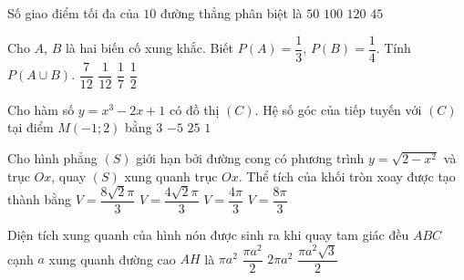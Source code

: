\begin{ex}%
	Số giao điểm tối đa của $10$ đường thẳng phân biệt là
	\choice
	{$50$}
	{$100$}
	{$120$}
	{\True $45$}
\end{ex}

\begin{ex}%
	Cho $A$, $B$ là hai biến cố xung khắc. Biết $P(A)=\dfrac{1}{3}$, $P(B)=\dfrac{1}{4}$. Tính $P(A \cup B)$.
	\choice
	{\True $\dfrac{7}{12}$}
	{$\dfrac{1}{12}$}
	{$\dfrac{1}{7}$}
	{$\dfrac{1}{2}$}
\end{ex}

\begin{ex}%
	Cho hàm số $y=x^3-2x+1$ có đồ thị $(C)$. Hệ số góc của tiếp tuyến với $(C)$ tại điểm $M(-1;2)$ bằng
	\choice
	{$3$}
	{$-5$}
	{$25$}
	{\True $1$}
\end{ex}

\begin{ex}%
	Cho hình phẳng $(S)$ giới hạn bởi đường cong có phương trình $y=\sqrt{2-x^2}$ và trục $Ox$, quay $(S)$ xung quanh trục $Ox$. Thể tích của khối tròn xoay được tạo thành bằng
	\choice
	{\True $V= \dfrac{8\sqrt{2}\pi}{3}$}
	{$V= \dfrac{4\sqrt{2}\pi}{3}$}
	{$V= \dfrac{4\pi}{3}$}
	{$V= \dfrac{8\pi}{3}$}
\end{ex}

\begin{ex}%
	Diện tích xung quanh của hình nón được sinh ra khi quay tam giác đều $ABC$ cạnh $a$ xung quanh đường cao $AH$ là
	\choice
	{$\pi a^2$}
	{\True $\dfrac{\pi a^2}{2}$}
	{$2 \pi a^2$}
	{$\dfrac{\pi a^2 \sqrt{3}}{2}$}
\end{ex}

